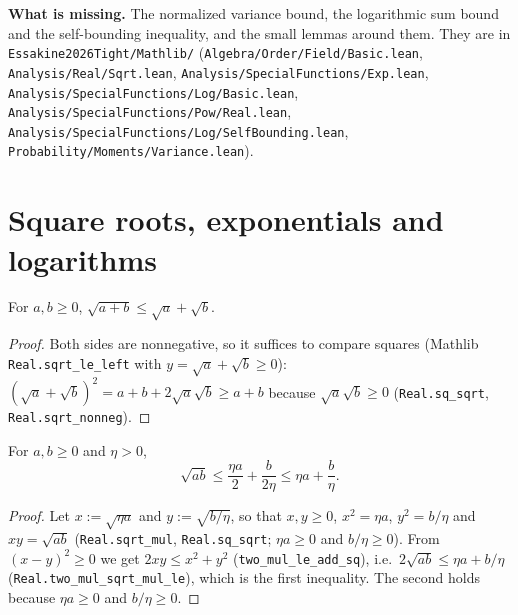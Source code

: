 \textbf{What is missing.} The normalized variance bound, the logarithmic sum bound and the
self-bounding inequality, and the small lemmas around them. They are in
\texttt{Essakine2026Tight/Mathlib/} (\texttt{Algebra/Order/Field/Basic.lean},
\texttt{Analysis/Real/Sqrt.lean}, \texttt{Analysis/SpecialFunctions/Exp.lean},
\texttt{Analysis/SpecialFunctions/Log/Basic.lean}, \texttt{Analysis/SpecialFunctions/Pow/Real.lean},
\texttt{Analysis/SpecialFunctions/Log/SelfBounding.lean},
\texttt{Probability/Moments/Variance.lean}).

\section{Square roots, exponentials and logarithms}
\label{sec:pre_analysis_basic}

\begin{lemma}\label{lem:sqrt_add_le}
\leanok
For $a, b \ge 0$, $\sqrt{a + b} \le \sqrt a + \sqrt b$.
\end{lemma}

\begin{proof}
\leanok
Both sides are nonnegative, so it suffices to compare squares (Mathlib
\texttt{Real.sqrt\_le\_left} with $y = \sqrt a + \sqrt b \ge 0$):
$(\sqrt a + \sqrt b)^2 = a + b + 2\sqrt a\sqrt b \ge a + b$ because $\sqrt a\sqrt b \ge 0$
(\texttt{Real.sq\_sqrt}, \texttt{Real.sqrt\_nonneg}).
\end{proof}

\begin{lemma}\label{lem:sqrt_mul_le}
\leanok
For $a, b \ge 0$ and $\eta > 0$,
\[
  \sqrt{ab} \le \frac{\eta a}{2} + \frac{b}{2\eta} \le \eta a + \frac{b}{\eta} .
\]
\end{lemma}

\begin{proof}
\leanok
Let $x := \sqrt{\eta a}$ and $y := \sqrt{b/\eta}$, so that $x, y \ge 0$, $x^2 = \eta a$,
$y^2 = b/\eta$ and $xy = \sqrt{ab}$ (\texttt{Real.sqrt\_mul}, \texttt{Real.sq\_sqrt}; $\eta a \ge 0$
and $b/\eta \ge 0$). From $(x - y)^2 \ge 0$ we get $2xy \le x^2 + y^2$
(\texttt{two\_mul\_le\_add\_sq}), i.e.\ $2\sqrt{ab} \le \eta a + b/\eta$
(\texttt{Real.two\_mul\_sqrt\_mul\_le}), which is the first
inequality. The second holds because $\eta a \ge 0$ and $b/\eta \ge 0$.
\end{proof}

